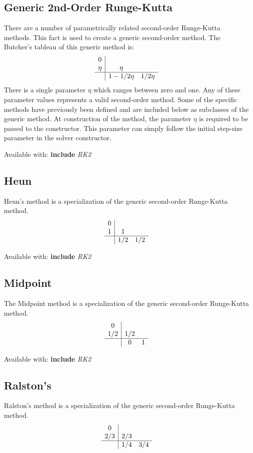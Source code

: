 \documentclass[letterpaper,10pt]{book}
\newcommand{\srcas}[1]{Available with: \textbf{include} \textlangle{}\textit{#1}\textrangle{}}
\begin{document}
      \subsection{Generic 2nd-Order Runge-Kutta}
	There are a number of parametrically related second-order Runge-Kutta methods.  This fact is used to create a generic second-order method.  The Butcher's tableau of this generic method is:
	\[
	  \begin{array}{c|cc}
	    0 & & \\
	    \eta & \eta & \\
	    \hline
	    & 1-1/2\eta & 1/2\eta
	  \end{array}
	\]
	There is a single parameter $\eta$ which ranges between zero and one.  Any of these parameter values represents a valid second-order method.  Some of the specific methods have previously been defined and are included below as subclasses of the generic method.  At construction of the method, the parameter $\eta$ is required to be passed to the constructor.  This parameter can simply follow the initial step-size parameter in the solver constructor.
	
	\srcas{RK2}
	    
      \subsection{Heun}
	Heun's method is a specialization of the generic second-order Runge-Kutta method.
	\[
	  \begin{array}{c|cc}
	    0 & & \\
	    1 & 1 & \\
	    \hline
	    & 1/2 & 1/2
	  \end{array}
	\]

	\srcas{RK2}
	
      \subsection{Midpoint}
	The Midpoint method is a specialization of the generic second-order Runge-Kutta method.      
	\[
	  \begin{array}{c|cc}
	    0 & & \\
	    1/2 & 1/2 & \\
	    \hline
	    & 0 & 1
	  \end{array}
	\]    

	\srcas{RK2}
	
      \subsection{Ralston's}
	Ralston's method is a specialization of the generic second-order Runge-Kutta method.      
	\[
	  \begin{array}{c|cc}
	    0 & & \\
	    2/3 & 2/3 & \\
	    \hline
	    & 1/4 & 3/4
	  \end{array}
	\]      
\end{document}
